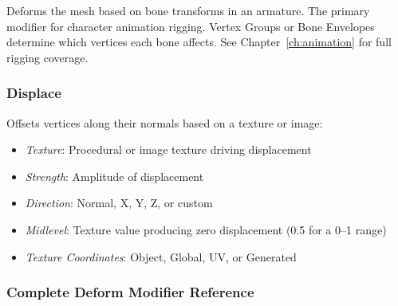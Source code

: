 Deforms the mesh based on bone transforms in an armature. The primary modifier for character animation rigging. Vertex Groups or Bone Envelopes determine which vertices each bone affects. See Chapter~\ref{ch:animation} for full rigging coverage.

\subsubsection{Displace}

Offsets vertices along their normals based on a texture or image:
\begin{itemize}[leftmargin=2em]
  \item \textit{Texture}: Procedural or image texture driving displacement
  \item \textit{Strength}: Amplitude of displacement
  \item \textit{Direction}: Normal, X, Y, Z, or custom
  \item \textit{Midlevel}: Texture value producing zero displacement (0.5 for a 0--1 range)
  \item \textit{Texture Coordinates}: Object, Global, UV, or Generated
\end{itemize}

\subsubsection{Complete Deform Modifier Reference}

